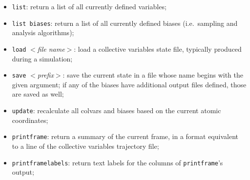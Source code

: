 \begin{itemize}
\item \texttt{list}: return a list of all currently defined variables;
\item \texttt{list biases}: return a list of all currently defined biases (i.e.~sampling and analysis algorithms);
\item \texttt{load} \emph{$<$file name$>$}: load a collective variables state file, typically produced during a simulation; 
\item \texttt{save} \emph{$<$prefix$>$}: save the current state in a file whose name begins with the given argument; if any of the biases have additional output files defined, those are saved as well;
\item \texttt{update}: recalculate all colvars and biases based on the current atomic coordinates;
\item \texttt{printframe}: return a summary of the current frame, in a format equivalent to a line of the collective variables trajectory file;
\item \texttt{printframelabels}: return text labels for the columns of \texttt{printframe}'s output;
\end{itemize}


